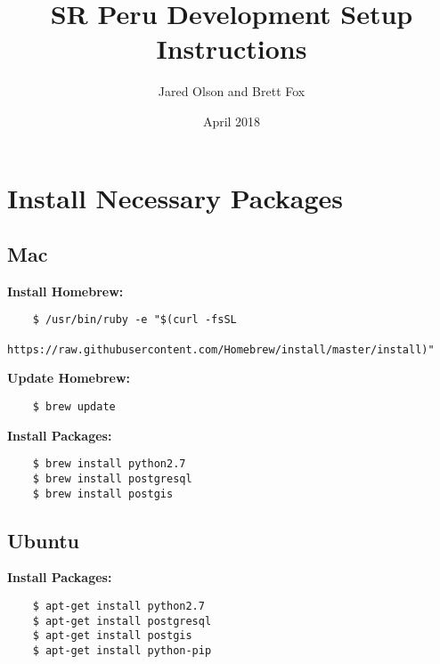 \documentclass{article}
\title{SR Peru Development Setup Instructions}
\author{ Jared Olson and Brett Fox }
\date{April 2018}
\begin{document}
\maketitle

\newpage
\tableofcontents
\newpage

\section{Install Necessary Packages}
\subsection{Mac}
\textbf{Install Homebrew:}
\begin{verbatim}
    $ /usr/bin/ruby -e "$(curl -fsSL 
    https://raw.githubusercontent.com/Homebrew/install/master/install)"
\end{verbatim}
\textbf{Update Homebrew:}
\begin{verbatim}
    $ brew update
\end{verbatim}
\textbf{Install Packages:}
\begin{verbatim}
    $ brew install python2.7
    $ brew install postgresql
    $ brew install postgis
\end{verbatim}

\subsection{Ubuntu}
\textbf{Install Packages:}
\begin{verbatim}
    $ apt-get install python2.7
    $ apt-get install postgresql
    $ apt-get install postgis
    $ apt-get install python-pip
\end{verbatim}
\end{document}
